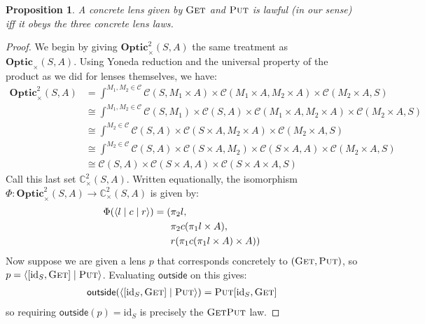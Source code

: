 \documentclass[11pt,letterpaper]{article}
\theoremstyle{plain}
\newtheorem{proposition}[theorem]{Proposition}
\theoremstyle{definition}
\newcommand{\C}{\mathscr{C}}
\newcommand{\Optic}{\mathbf{Optic}}
\newcommand{\Twoptic}{\mathbf{Optic}^2}
\newcommand{\conctwice}{\mathbb{C}^2}
\newcommand{\id}{\mathrm{id}}
\newcommand{\rep}[2]{{\ensuremath \left\langle #1 \mid #2 \right\rangle}}
\newcommand{\repthree}[3]{{\ensuremath \langle #1 \mid #2 \mid #3 \rangle}}
\newcommand{\fget}{\textsc{Get}}
\newcommand{\fput}{\textsc{Put}}
\newcommand{\outside}{\mathsf{outside}}
\begin{document}
\begin{proposition}\label{prop:lawful-lens-laws}
  A concrete lens given by $\fget$ and $\fput$ is lawful (in our sense) iff it obeys the three concrete lens laws.
\end{proposition}
\begin{proof}
  We begin by giving $\Twoptic_\times(S, A)$ the same treatment as $\Optic_\times(S, A)$. Using Yoneda reduction and the universal property of the product as we did for lenses themselves, we have:
  \begin{align*}
  \Twoptic_\times(S, A)
  &= \int^{M_1, M_2 \in \C} \C(S, M_1 \times A) \times \C(M_1 \times A, M_2 \times A) \times \C(M_2 \times A, S) \\
  &\cong \int^{M_1, M_2 \in \C} \C(S, M_1) \times \C(S, A) \times \C(M_1 \times A, M_2 \times A) \times \C(M_2 \times A, S) \\
  &\cong \int^{M_2 \in \C} \C(S, A) \times \C(S \times A, M_2 \times A) \times \C(M_2 \times A, S) \\
  &\cong \int^{M_2 \in \C} \C(S, A) \times \C(S \times A, M_2) \times \C(S \times A, A) \times \C(M_2 \times A, S) \\
  &\cong \C(S, A) \times \C(S \times A, A) \times \C(S \times A \times A, S)
  \end{align*}
  Call this last set $\conctwice_\times(S, A)$. Written equationally, the isomorphism $\Phi : \Twoptic_\times(S, A) \to \conctwice_\times(S, A)$ is given by:
  \begin{align*}
    \Phi(\repthree{l}{c}{r}) = (&\pi_2 l, \\
                                   &\pi_2 c (\pi_1 l \times A), \\
                                   &r(\pi_1 c (\pi_1 l \times A) \times A))
  \end{align*}
  Now suppose we are given a lens $p$ that corresponds concretely to $(\fget, \fput)$, so $p = \rep{[\id_S, \fget]}{\fput}$. Evaluating $\outside$ on this gives:
  \begin{align*}
    \outside(\rep{[\id_S, \fget]}{\fput}) = \fput [\id_S, \fget]
  \end{align*}
  so requiring $\outside(p) = \id_S$ is precisely the $\fget\fput$ law.


\end{proof}
\end{document}
